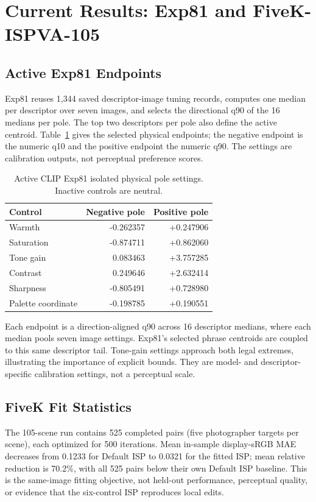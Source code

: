 \documentclass[journal]{IEEEtran}
\begin{document}
\section{Current Results: Exp81 and FiveK-ISPVA-105}
\subsection{Active Exp81 Endpoints}
Exp81 reuses 1,344 saved descriptor-image tuning records, computes one median per descriptor over seven images, and selects the directional q90 of the 16 medians per pole. The top two descriptors per pole also define the active centroid. Table~\ref{tab:endpoints} gives the selected physical endpoints; the negative endpoint is the numeric q10 and the positive endpoint the numeric q90. The settings are calibration outputs, not perceptual preference scores.

\begin{table}[t]
\caption{Active CLIP Exp81 isolated physical pole settings. Inactive controls are neutral.}
\label{tab:endpoints}
\centering
\footnotesize
\begin{tabular}{lrr}
\toprule
Control & Negative pole & Positive pole \\
\midrule
Warmth & -0.262357 & +0.247906 \\
Saturation & -0.874711 & +0.862060 \\
Tone gain & 0.083463 & +3.757285 \\
Contrast & 0.249646 & +2.632414 \\
Sharpness & -0.805491 & +0.728980 \\
Palette coordinate & -0.198785 & +0.190551 \\
\bottomrule
\end{tabular}
\end{table}

Each endpoint is a direction-aligned q90 across 16 descriptor medians, where each median pools seven image settings. Exp81's selected phrase centroids are coupled to this same descriptor tail. Tone-gain settings approach both legal extremes, illustrating the importance of explicit bounds. They are model- and descriptor-specific calibration settings, not a perceptual scale.

\subsection{FiveK Fit Statistics}
The 105-scene run contains 525 completed pairs (five photographer targets per scene), each optimized for 500 iterations. Mean in-sample display-sRGB MAE decreases from 0.1233 for Default ISP to 0.0321 for the fitted ISP; mean relative reduction is 70.2\%, with all 525 pairs below their own Default ISP baseline. This is the same-image fitting objective, not held-out performance, perceptual quality, or evidence that the six-control ISP reproduces local edits.
\end{document}

